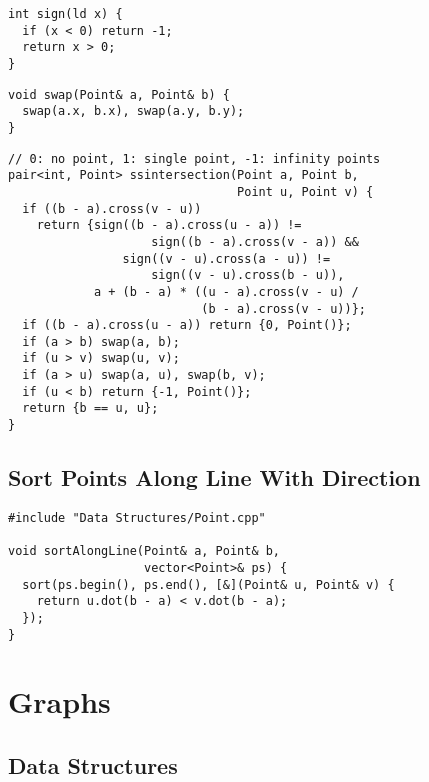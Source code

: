 \documentclass[twoside]{article}
\begin{document}
\begin{multicols*}{2}
\begin{verbatim}
int sign(ld x) {
  if (x < 0) return -1;
  return x > 0;
}
\end{verbatim}
\vspace{-12pt}
\begin{verbatim}
void swap(Point& a, Point& b) {
  swap(a.x, b.x), swap(a.y, b.y);
}
\end{verbatim}
\vspace{-12pt}
\begin{verbatim}
// 0: no point, 1: single point, -1: infinity points
pair<int, Point> ssintersection(Point a, Point b,
                                Point u, Point v) {
  if ((b - a).cross(v - u))
    return {sign((b - a).cross(u - a)) !=
                    sign((b - a).cross(v - a)) &&
                sign((v - u).cross(a - u)) !=
                    sign((v - u).cross(b - u)),
            a + (b - a) * ((u - a).cross(v - u) /
                           (b - a).cross(v - u))};
  if ((b - a).cross(u - a)) return {0, Point()};
  if (a > b) swap(a, b);
  if (u > v) swap(u, v);
  if (a > u) swap(a, u), swap(b, v);
  if (u < b) return {-1, Point()};
  return {b == u, u};
}
\end{verbatim}

\subsectionfont{\large\bfseries\sffamily\underline}
\subsection*{Sort Points Along Line With Direction}
\begin{verbatim}
#include "Data Structures/Point.cpp"

void sortAlongLine(Point& a, Point& b,
                   vector<Point>& ps) {
  sort(ps.begin(), ps.end(), [&](Point& u, Point& v) {
    return u.dot(b - a) < v.dot(b - a);
  });
}
\end{verbatim}

\sectionfont{\bfseries\sffamily\centering\Huge}
\vspace{1em}
\section*{Graphs}
\vspace{3em}
\subsectionfont{\bfseries\sffamily\centering\LARGE}
\vspace{0em}
\subsection*{Data Structures}
\vspace{2em}
\subsubsectionfont{\large\bfseries\sffamily\underline}

\end{multicols*}
\end{document}
